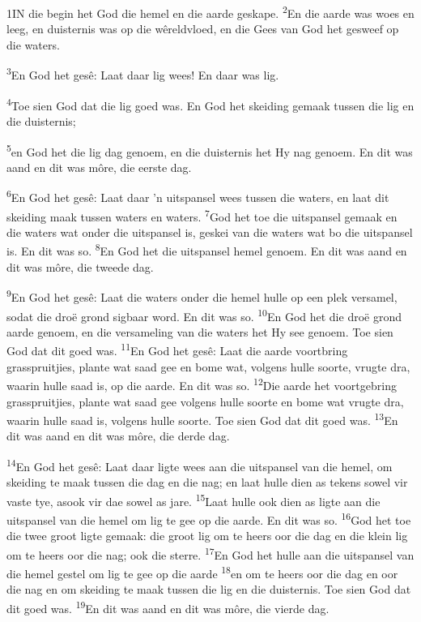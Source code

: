 \documentclass[10pt,oneside,a4paper]{memoir}
\renewcommand{\verse}[1]{\textsuperscript{#1}}
\def\biblsyntheticpar{\hfil\vadjust{\vskip\parskip}\break\indent}
\begin{document}
\mainmatter
%
\begin{paracol}{2}
\lettrine[lines=4, findent=3pt, nindent=0pt]{1}
IN die begin het God die hemel en die aarde geskape.
\biblsyntheticpar
\verse{2}En die aarde was woes en leeg, en duisternis was op die wêreldvloed, en die Gees van God het gesweef op die waters.

\verse{3}En God het gesê: Laat daar lig wees! En daar was lig.

\verse{4}Toe sien God dat die lig goed was. En God het skeiding gemaak tussen die lig en die duisternis;

\verse{5}en God het die lig dag genoem, en die duisternis het Hy nag genoem. En dit was aand en dit was môre, die eerste dag.

\verse{6}En God het gesê: Laat daar ’n uitspansel wees tussen die waters, en laat dit skeiding maak tussen waters en waters.
\verse{7}God het toe die uitspansel gemaak en die waters wat onder die uitspansel is, geskei van die waters wat bo die uitspansel is. En dit was so.
\verse{8}En God het die uitspansel hemel genoem. En dit was aand en dit was môre, die tweede dag.

\verse{9}En God het gesê: Laat die waters onder die hemel hulle op een plek versamel, sodat die droë grond sigbaar word. En dit was so.
\verse{10}En God het die droë grond aarde genoem, en die versameling van die waters het Hy see genoem. Toe sien God dat dit goed was.
\verse{11}En God het gesê: Laat die aarde voortbring grasspruitjies, plante wat saad gee en bome wat, volgens hulle soorte, vrugte dra, waarin hulle saad is, op die aarde. En dit was so.
\verse{12}Die aarde het voortgebring grasspruitjies, plante wat saad gee volgens hulle soorte en bome wat vrugte dra, waarin hulle saad is, volgens hulle soorte. Toe sien God dat dit goed was.
\verse{13}En dit was aand en dit was môre, die derde dag.

\verse{14}En God het gesê: Laat daar ligte wees aan die uitspansel van die hemel, om skeiding te maak tussen die dag en die nag; en laat hulle dien as tekens sowel vir vaste tye, asook vir dae sowel as jare.
\verse{15}Laat hulle ook dien as ligte aan die uitspansel van die hemel om lig te gee op die aarde. En dit was so.
\verse{16}God het toe die twee groot ligte gemaak: die groot lig om te heers oor die dag en die klein lig om te heers oor die nag; ook die sterre.
\verse{17}En God het hulle aan die uitspansel van die hemel gestel om lig te gee op die aarde
\verse{18}en om te heers oor die dag en oor die nag en om skeiding te maak tussen die lig en die duisternis. Toe sien God dat dit goed was.
\verse{19}En dit was aand en dit was môre, die vierde dag.


\end{paracol}
\end{document}
